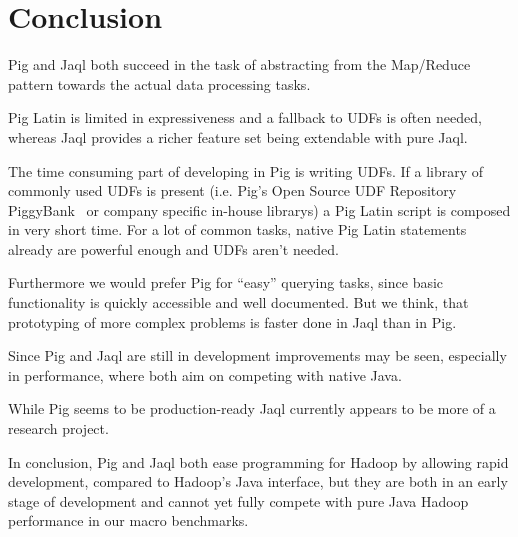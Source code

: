 \section{Conclusion}

Pig and Jaql both succeed in the task of abstracting from the Map/Reduce pattern towards the actual data processing tasks.

Pig Latin is limited in expressiveness and a fallback to UDFs is often needed, whereas Jaql provides a
richer feature set being extendable with pure Jaql.

The time consuming part of developing in Pig is writing UDFs. If a library of commonly used UDFs is present (i.e. Pig's Open Source UDF Repository PiggyBank~\cite{pigPiggyBank} or company specific in-house librarys) a Pig Latin script is composed in very short time. For a lot of common tasks, native Pig Latin statements already are powerful enough and UDFs aren't needed.

Furthermore we would prefer Pig for ``easy'' querying tasks, since basic functionality is quickly accessible and well documented. But we think, that prototyping of more complex problems is faster done in Jaql than in Pig.

Since Pig and Jaql are still in development improvements may be seen, especially in performance, where
both aim on competing with native Java.

While Pig seems to be production-ready Jaql currently appears to be more of a research project. 

In conclusion, Pig and Jaql both ease programming for Hadoop by allowing rapid development, compared to
Hadoop's Java interface, but they are both in an early stage of development and cannot yet fully
compete with pure Java Hadoop performance in our macro benchmarks.